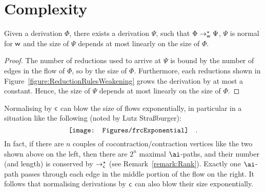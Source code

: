 \section{Complexity}\label{section:FlowRewriteComplexity}

\begin{proposition}\label{proposition:SizeWeakeningReduction}
Given a derivation $\Phi$, there exists a derivation $\Psi$, such that $\Phi\to_{\mathsf w}^\star\Psi$, $\Psi$ is normal for ${\mathsf w}$ and the size of $\Psi$ depends at most linearly on the size of $\Phi$.
\end{proposition}

\begin{proof}
The number of reductions used to arrive at $\Psi$ is bound by the number of edges in the flow of $\Phi$, so by the size of $\Phi$. Furthermore, each reductions shown in Figure~\vref{figure:ReductionRulesWeakening} grows the derivation by at most a constant. Hence, the size of $\Psi$ depends at most linearly on the size of $\Phi$.
\end{proof}

\begin{remark}\label{remark:RewriteContractionExponential}
Normalising by ${\mathsf c}$ can blow the size of flows exponentially, in particular in a situation like the following (noted by Lutz Stra{\ss}burger):
\[
\vcenter{\hbox{\texttt{[image: Figures/frcExponential]}}}
\quad.
\]
In fact, if there are $n$ couples of cocontraction/contraction vertices like the two shown above on the left, then there are $2^n$ maximal $\ai$-paths, and their number (and length) is conserved by $\to_{\mathsf c}^\star$ (see Remark~\vref{remark:Rank}). Exactly one $\ai$-path passes through each edge in the middle portion of the flow on the right. It follows that normalising derivations by ${\mathsf c}$ can also blow their size exponentially.
\end{remark}

